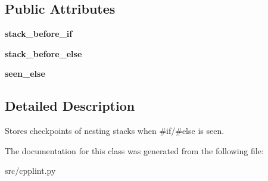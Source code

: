 \subsection*{Public Attributes}
\begin{DoxyCompactItemize}
\item 
{\bfseries stack\+\_\+before\+\_\+if}\hypertarget{classcpplint_1_1__PreprocessorInfo_a0681b2adca3171a495fc1eca43d245c0}{}\label{classcpplint_1_1__PreprocessorInfo_a0681b2adca3171a495fc1eca43d245c0}

\item 
{\bfseries stack\+\_\+before\+\_\+else}\hypertarget{classcpplint_1_1__PreprocessorInfo_a34a80f1f97808614b7062ba1e5bbf2b9}{}\label{classcpplint_1_1__PreprocessorInfo_a34a80f1f97808614b7062ba1e5bbf2b9}

\item 
{\bfseries seen\+\_\+else}\hypertarget{classcpplint_1_1__PreprocessorInfo_a7587e84a1e6db34c3c94317f5a5931cc}{}\label{classcpplint_1_1__PreprocessorInfo_a7587e84a1e6db34c3c94317f5a5931cc}

\end{DoxyCompactItemize}


\subsection{Detailed Description}
\begin{DoxyVerb}Stores checkpoints of nesting stacks when #if/#else is seen.\end{DoxyVerb}
 

The documentation for this class was generated from the following file\+:\begin{DoxyCompactItemize}
\item 
src/cpplint.\+py\end{DoxyCompactItemize}
